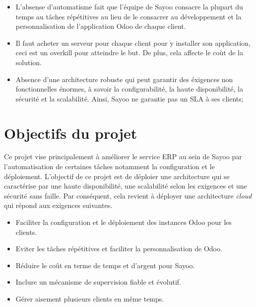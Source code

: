 \begin{onehalfspace}
\begin{itemize}
\item L'absense d'automatisme fait que l'équipe de Sayoo consacre la plupart du temps au tâches répétitives au lieu de le consacrer au développement et la personnalisation de l'application Odoo de chaque client. 

\item Il faut acheter un serveur pour chaque client pour y installer son application, ceci est un overkill pour atteindre le but. De plus, cela affecte le coùt de la solution.

\item Absence d'une architecture robuste qui peut garantir des éxigences non fonctionnelles énormes, à savoir la configurabilité, la haute disponibilité, la sécurité et la scalabilité. Ainsi, Sayoo ne garantie pas un SLA à ses clients;

\end{itemize}




\section{Objectifs du projet}
Ce projet vise principalement à améliorer le service ERP au sein de Sayoo par l'automatisation de certaines tâches notamment la configuration et le déploiement. L'objectif de ce projet est de déploier une architecture qui se caractérise par une haute disponibilité, une scalabilité selon les exigences et une sécurité sans faille. Par conséquent, cela revient à déployer une architecture \emph{cloud} qui répond aux exigences suivantes.
\begin{itemize}

\item Faciliter la configuration et le déploiement des instances Odoo pour les clients.

\item Eviter les tâches répétitives et faciliter la personnalisation de Odoo.

\item Réduire le coût en terme de temps et d'argent pour Sayoo.

\item Inclure un mécanisme de supervision fiable et évolutif.

\item Gérer aisement plusieurs clients en même temps.  
 







\end{itemize}
\end{onehalfspace}
